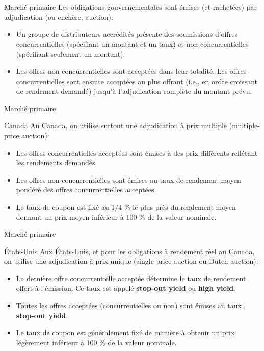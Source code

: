 \documentclass{beamer}
\begin{document}
\begin{frame}{Marché primaire}
Les obligations gouvernementales sont émises (et rachetées) par adjudication (ou enchère, auction):
\begin{itemize}
\item Un groupe de distributeurs accrédités présente des soumissions d’offres concurrentielles (spécifiant un montant et un taux) et non concurrentielles (spécifiant seulement un montant).  
\item Les offres non concurrentielles sont acceptées dans leur totalité. Les offres concurrentielles sont ensuite acceptées au plus offrant (i.e., en ordre croissant de rendement demandé) jusqu’à l’adjudication complète du montant prévu. 
\end{itemize}
\end{frame}


\begin{frame}{Marché primaire}
\begin{block}{Canada}
Au Canada, on utilise surtout une adjudication à prix multiple (multiple-price auction):  
\begin{itemize}
\item Les offres concurrentielles acceptées sont émises à des prix différents reflétant les rendements demandés.  
\item Les offres non concurrentielles sont émises au taux de rendement moyen pondéré des offres concurrentielles acceptées.
\item Le taux de coupon est fixé au $1/4$ \% le plus près du rendement moyen donnant un prix moyen inférieur à 100 \% de la valeur nominale.  
\end{itemize}
\end{block}
\end{frame}



\begin{frame}{Marché primaire}
\begin{block}{États-Unis}
Aux États-Unis, et pour les obligations à rendement réel au Canada, on utilise une adjudication à prix unique (single-price auction ou Dutch auction):  
\begin{itemize}
\item La dernière offre concurrentielle acceptée détermine le taux de rendement offert à l’émission.  Ce taux est appelé \textbf{stop-out yield} ou \textbf{high yield}.
\item Toutes les offres acceptées (concurrentielles ou non) sont émises au taux \textbf{stop-out yield}.
\item Le taux de coupon est généralement fixé de manière à obtenir un prix légèrement inférieur à 100 \% de la valeur nominale.  
\end{itemize}
\end{block}
\end{frame}
\end{document}
